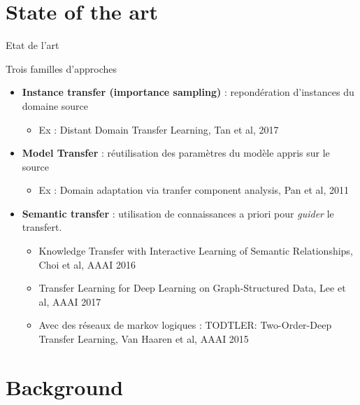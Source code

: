 \documentclass{beamer}
\begin{document}
\section{State of the art}
\begin{frame}{Etat de l'art}

\begin{block}{Trois familles d'approches}
\begin{itemize}
    \item \textbf{Instance transfer (importance sampling)} : repondération d'instances du domaine source
    \begin{itemize}
    \footnotesize
        \item Ex : Distant Domain Transfer Learning, Tan et al, 2017
    \end{itemize}
    \item \textbf{Model Transfer} : réutilisation des paramètres du modèle appris sur le source
     \begin{itemize}
    \footnotesize
        \item Ex : Domain adaptation via tranfer component analysis, Pan et al, 2011
    \end{itemize}
    \item \textbf{Semantic transfer} : utilisation de connaissances a priori pour \textit{guider} le transfert.
    \begin{itemize}
    \footnotesize
        \item Knowledge Transfer with Interactive Learning of Semantic Relationships, Choi et al, AAAI 2016
        \item Transfer Learning for Deep Learning on Graph-Structured Data, Lee et al, AAAI 2017
        \item Avec des réseaux de markov logiques : TODTLER: Two-Order-Deep Transfer Learning, Van Haaren et al, AAAI 2015
    \end{itemize}
\end{itemize}
\end{block}

\end{frame}




\section[Background]{Background}
\end{document}
